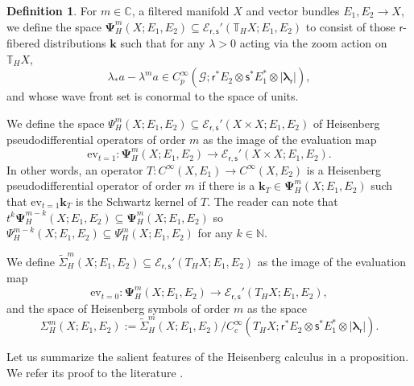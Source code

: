 \documentclass[a4paper,reqno]{amsart}
\numberwithin{equation}{section}
\def\C{\mathbb{C}}
\def\N{\mathbb{N}}
\theoremstyle{definition}
\newtheorem{definition}[thm]{Definition}
\theoremstyle{remark}
\begin{document}
\begin{definition}
For $m\in \C$, a filtered manifold $X$ and vector bundles $E_1,E_2\to X$, we define the space $\pmb{\Psi}^m_H(X;E_1,E_2)\subseteq \mathcal{E}_{\mathsf{r},\mathsf{s}}'(\mathbb{T}_HX;E_1,E_2)$ to consist of those $\mathsf{r}$-fibered distributions $\pmb{k}$ such that for any $\lambda>0$ acting via the zoom action on $\mathbb{T}_HX$, 
$$\lambda_*a-\lambda^ma\in C^\infty_p(\mathcal{G};\mathsf{r}^*E_2\otimes \mathsf{s}^*E_1^*\otimes |\pmb{\lambda}_\mathsf{r}|),$$
and whose wave front set is conormal to the space of units.

We define the space $\Psi^m_H(X;E_1,E_2)\subseteq \mathcal{E}_{\mathsf{r},\mathsf{s}}'(X\times X;E_1,E_2)$ of Heisenberg pseudodifferential operators of order $m$ as the image of the evaluation map 
$$\mathrm{ev}_{t=1}:\pmb{\Psi}^m_H(X;E_1,E_2)\to \mathcal{E}_{\mathsf{r},\mathsf{s}}'(X\times X;E_1,E_2).$$
In other words, an operator $T:C^\infty(X,E_1)\to C^\infty(X,E_2)$ is a Heisenberg pseudodifferential operator of order $m$ if there is a $\pmb{k}_T\in \pmb{\Psi}^m_H(X;E_1,E_2)$ such that $\mathrm{ev}_{t=1}\pmb{k}_T$ is the Schwartz kernel of $T$. The reader can note that $t^k\pmb{\Psi}^{m-k}_H(X;E_1,E_2)\subseteq \pmb{\Psi}^m_H(X;E_1,E_2)$ so $\Psi^{m-k}_H(X;E_1,E_2)\subseteq \Psi^m_H(X;E_1,E_2)$ for any $k\in \N$.

We define $\tilde{\Sigma}_H^m(X;E_1,E_2)\subseteq \mathcal{E}_{\mathsf{r},\mathsf{s}}'(T_HX;E_1,E_2)$ as the image of the evaluation map 
$$\mathrm{ev}_{t=0}:\pmb{\Psi}^m_H(X;E_1,E_2)\to \mathcal{E}_{\mathsf{r},\mathsf{s}}'(T_H X;E_1,E_2),$$
and the space of Heisenberg symbols of order $m$ as the space 
$$\Sigma_H^m(X;E_1,E_2):=\tilde{\Sigma}_H^m(X;E_1,E_2)/C^\infty_c(T_H X;\mathsf{r}^*E_2\otimes \mathsf{s}^*E_1^*\otimes |\pmb{\lambda}_\mathsf{r}|).$$
\end{definition}

Let us summarize the salient features of the Heisenberg calculus in a proposition. We refer its proof to the literature \cite{Dave_Haller1,ewertfixed,goffkuz,vanerpyunck}.
\end{document}
